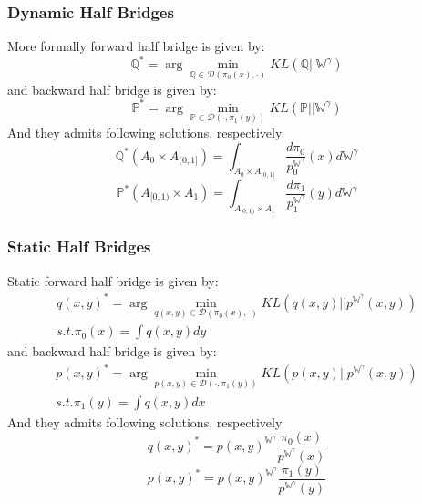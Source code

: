 \documentclass{article}
\begin{document}
\subsubsection{Dynamic Half Bridges}
More formally forward half bridge is given by:
\begin{equation}
    \mathbb{Q}^*=\arg\min_{\mathbb{Q}\in\mathcal{D}(\pi_0(x), \cdot)}KL\left(\mathbb{Q}||\mathbb{W}^\gamma\right)
\end{equation}
and backward half bridge is given by:
\begin{equation}
    \mathbb{P}^*=\arg\min_{\mathbb{P}\in\mathcal{D}(\cdot, \pi_1(y))}KL\left(\mathbb{P}||\mathbb{W}^\gamma\right)
\end{equation}
And they admits following solutions, respectively 
\begin{equation}
    \mathbb{Q}^*(A_0\times A_{(0,1]})=\int_{A_0\times A_{(0,1]}}\frac{d\pi_0}{p_0^{\mathbb{W}^\gamma}}(x)d\mathbb{W}^\gamma
\end{equation}
\begin{equation}
    \mathbb{P}^*(A_{[0,1)} \times A_1)=\int_{A_{[0,1)} \times A_1}\frac{d\pi_1}{p_1^{\mathbb{W}^\gamma}}(y)d\mathbb{W}^\gamma
\end{equation}
\subsubsection{Static Half Bridges}
Static forward half bridge is given by:
\begin{equation}
\begin{split}
    q(x,y)^*=\arg\min_{q(x,y)\in\mathcal{D}(\pi_0(x), \cdot)}KL\left(q(x,y)||p^{\mathbb{W}^\gamma}(x,y)\right) \\
    s.t. \pi_0(x) = \int q(x, y)dy
\end{split}
\end{equation}
and backward half bridge is given by:
\begin{equation}
\begin{split}
    p(x,y)^*=\arg\min_{p(x,y)\in\mathcal{D}(\cdot, \pi_1(y))}KL\left(p(x,y)||p^{\mathbb{W}^\gamma}(x,y)\right) \\
    s.t. \pi_1(y) = \int q(x, y)dx
\end{split}
\end{equation}
And they admits following solutions, respectively
\begin{equation}
    q(x,y)^*=p(x,y)^{\mathbb{W}^\gamma}\frac{\pi_0(x)}{p^{\mathbb{W}^\gamma}(x)}
\end{equation}
\begin{equation}
    p(x,y)^*=p(x,y)^{\mathbb{W}^\gamma}\frac{\pi_1(y)}{p^{\mathbb{W}^\gamma}(y)}
\end{equation}
\end{document}
